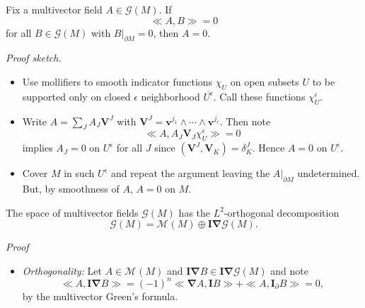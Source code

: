 \documentclass[aspectratio=169,handout]{beamer}
\newcommand{\grad}{\boldsymbol{\nabla}}
\newcommand{\G}{\mathcal{G}}
\newcommand{\blade}[1]{\boldsymbol{#1}}
\newcommand{\multivecinnerproduct}[2]{\ll #1, #2\gg}
\newcommand{\boundary}{{\partial M}}
\newcommand{\pseudoscalar}{\blade{I}}
\newcommand{\monogenicfields}[1]{\mathcal{M}^{#1}(M)}
\begin{document}

\begin{frame}{}
\vfill
\begin{lemma}
Fix a multivector field $A\in \G(M)$. If
\[
\multivecinnerproduct{A}{B}=0
\]
for all $B\in \G(M)$ with $B\vert_{\boundary} = 0$, then $A=0$.
\end{lemma}
\vfill
\end{frame}

\begin{frame}{}
\vfill
\emph{Proof sketch.}
\begin{itemize}
\item Use mollifiers to smooth indicator functions $\chi_U$ on open subsets $U$ to be supported only on closed $\epsilon$ neighborhood $\overline{U^\epsilon}$. Call these functions $\chi_U^\epsilon$.
\item Write $A=\sum_J A_J \blade{V}^J$ with $\blade{V}^J = \blade{v}^{j_1}\wedge \cdots\wedge  \blade{v}^{j_r}$. Then note
    \[
    \multivecinnerproduct{A}{A_J \blade{V}_J \chi_U^\epsilon} = 0
    \] 
    implies $A_J=0$ on $U^\epsilon$ for all $J$ since $(\blade{V}^{J}, \blade{V}_K)=\delta^J_K$. Hence $A=0$ on $U^\epsilon$.
\item Cover $M$ in such $U^\epsilon$ and repeat the argument leaving the $A\vert_\boundary$ undetermined. But, by smoothness of $A$, $A=0$ on $M$.
\end{itemize}
\vfill
\end{frame}

\begin{frame}{}
\vfill
\begin{theorem}
The space of multivector fields $\G(M)$ has the $L^2$-orthogonal decomposition
\[
\G(M) = \monogenicfields{} \oplus \pseudoscalar \grad \G(M).
\]
\end{theorem}
\vfill
\end{frame}

\begin{frame}
\vfill
\emph{Proof}
\begin{itemize}
\item \emph{Orthogonality:} Let $A \in \monogenicfields{}$ and $\pseudoscalar \grad B \in \pseudoscalar \grad \G(M)$ and note
\[
\multivecinnerproduct{A}{\pseudoscalar \grad B} = (-1)^n \multivecinnerproduct{\grad A}{\pseudoscalar B} + \multivecinnerproduct{A}{\pseudoscalar_\partial B} = 0,
\]
by the multivector Green's formula.
\end{itemize}
\vfill
\end{frame}
\end{document}
